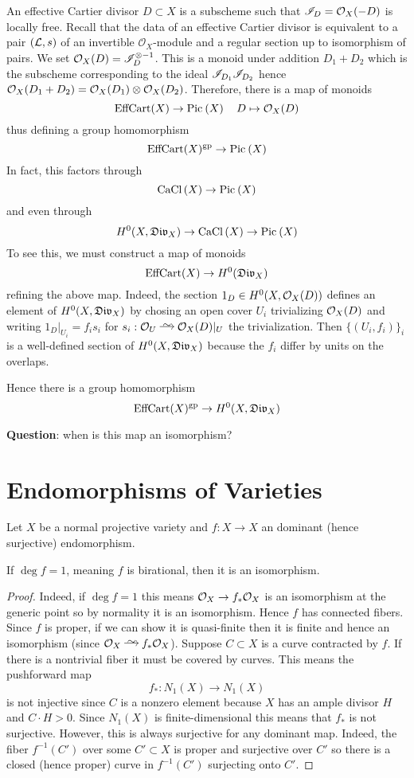 \documentclass[12pt]{article}
\newcommand{\cO}{\mathcal{O}}
\begin{document}
\newcommand{\EffCart}{\mathrm{EffCart}}
\newcommand{\gp}{\mathrm{gp}}

An effective Cartier divisor $D \subset X$ is a subscheme such that $\mathscr{I}_D = \mathcal{O}_{X}(-D)$ is locally free. Recall that the data of an effective Cartier divisor is equivalent to a pair $(\mathcal{L}, s)$ of an invertible $\cO_X$-module and a regular section up to isomorphism of pairs. We set $\mathcal{O}_{X}(D) = \mathscr{I}_D^{\otimes -1}$. This is a monoid under addition $D_1 + D_2$ which is the subscheme corresponding to the ideal $\mathscr{I}_{D_1} \mathscr{I}_{D_2}$ hence $\mathcal{O}_{X}(D_1 + D_2) = \mathcal{O}_{X}(D_1) \otimes \mathcal{O}_{X}(D_2)$. Therefore, there is a map of monoids
\[ \EffCart(X) \to \Pic{X} \quad D \mapsto \struct{X}(D) \]
thus defining a group homomorphism
\[ \EffCart(X)^{\gp} \to \Pic{X} \]
In fact, this factors through
\[ \mathrm{CaCl}\left( X \right) \to \mathrm{Pic}^{} \left( X \right) \]
and even through
\[ H^0(X, \mathfrak{Div}_X) \to \mathrm{CaCl}\left( X \right) \to \mathrm{Pic}^{} \left( X \right) \]
To see this, we must construct a map of monoids
\[ \EffCart(X) \to H^0(\Div_X) \]
refining the above map. Indeed, the section $1_D \in H^0(X, \mathcal{O}_{X}(D))$ defines an element of $H^0(X, \mathfrak{Div}_X)$ by chosing an open cover $U_i$ trivializing $\mathcal{O}_{X}(D)$ and writing $1_D |_{U_i} = f_i s_i$ for $s_i : \struct{U} \iso \struct{X}(D)|_U$ the trivialization. Then $\{(U_i, f_i)\}_i$ is a well-defined section of $H^0(X, \mathfrak{Div}_X)$ because the $f_i$ differ by units on the overlaps. 
\par
Hence there is a group homomorphism 
\[ \EffCart(X)^{\gp} \to H^0(X, \Div_X) \]

\textbf{Question}: when is this map an isomorphism?

\section{Endomorphisms of Varieties}

Let $X$ be a normal projective variety and $f : X \to X$ an dominant (hence surjective) endomorphism. 

\begin{prop}
If $\deg{f} = 1$, meaning $f$ is birational, then it is an isomorphism.
\end{prop}

\begin{proof}
Indeed, if $\deg{f} = 1$ this means $\mathcal{O}_{X} \to f_* \mathcal{O}_{X}$ is an isomorphism at the generic point so by normality it is an isomorphism. Hence $f$ has connected fibers. Since $f$ is proper, if we can show it is quasi-finite then it is finite and hence an isomorphism (since $\struct{X} \iso f_* \struct{X}$). Suppose $C \subset X$ is a curve contracted by $f$. If there is a nontrivial fiber it must be covered by curves. This means the pushforward map
\[ f_* : N_1(X) \to N_1(X) \]
is not injective since $C$ is a nonzero element because $X$ has an ample divisor $H$ and $C \cdot H > 0$. Since $N_1(X)$ is finite-dimensional this means that $f_*$ is not surjective. However, this is always surjective for any dominant map. Indeed, the fiber $f^{-1}(C')$ over some $C' \subset X$ is proper and surjective over $C'$ so there is a closed (hence proper) curve in $f^{-1}(C')$ surjecting onto $C'$. 
\end{proof}
\end{document}
